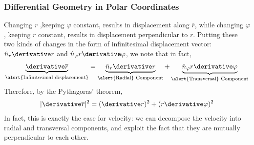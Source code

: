 \begin{frame}
\frametitle{Differential Geometry in Polar Coordinates}
Changing $r$ ,keeping $\varphi$ constant, results in displacement \alert{along} $\overline{r}$, while changing $\varphi$, keeping $r$ constant, results in displacement \alert{perpendicular} to $\overline{r}$. Putting these two kinds of changes in the form of \alert{infinitesimal displacement vector}: $\hat n_r \derivative r$ and $\hat n_\varphi r\derivative \varphi$, we note that in fact, \[
\underbrace{\derivative \overline{r}}_{\text{\alert{Infinitesimal displacement}}}=\underbrace{\hat n_r \derivative r}_{\text{\alert{Radial} Component}}+\underbrace{\hat n_\varphi r\derivative\varphi}_{\text{\alert{Transversal} Component}}
\]
Therefore, by the \alert{Pythagoras' theorem},
\[
|\derivative \overline{r}|^2=(\derivative r)^2+(r\derivative\varphi)^2
\]
In fact, this is exactly the case for \alert{velocity}: we can decompose the velocity into \alert{radial} and \alert{transversal} components, and exploit the fact that they are \alert{mutually perpendicular} to each other.
\end{frame}
